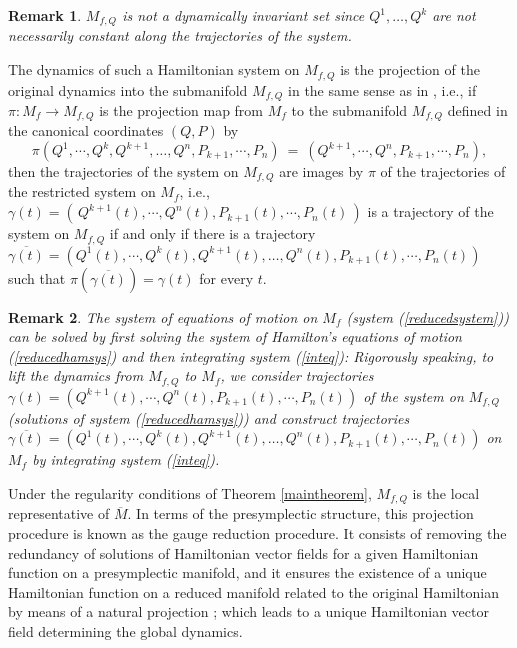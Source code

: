 \documentclass[10pt,a4paper]{article}
\newtheorem{remark}{Remark}
\begin{document}
\begin{remark}
$M_{f,Q}$ is not a dynamically invariant set since $Q^{1},\ldots,Q^{k}$ are not necessarily constant along the trajectories of the system. 
\end{remark}

The dynamics of such a Hamiltonian system on $M_{f,Q}$ is the projection of the original dynamics into the submanifold $M_{f,Q}$ in the same sense as in \cite{escobar2024particular}, i.e., if $\pi:M_{f}\longrightarrow M_{f,Q}$ is the projection map from $M_{f}$ to the submanifold $M_{f,Q}$ defined in the canonical coordinates $(Q,P)$ by 
\begin{equation*}
\pi(Q^{1},\cdots,Q^{k},Q^{k+1},\ldots,Q^{n},P_{k+1},\cdots,P_{n})\ = \ (Q^{k+1},\cdots,Q^{n},P_{k+1},\cdots,P_{n}),
\end{equation*}
then the trajectories of the system on $M_{f,Q}$ are images by $\pi$ of the trajectories of the restricted system on $M_{f}$, i.e., $\gamma(t)=(\,Q^{k+1}(t),\cdots,Q^{n}(t),P_{k+1}(t),\cdots,P_{n}(t)\,)$ is a trajectory of the system on $M_{f,Q}$ if and only if there is a trajectory $\overline{\gamma(t)}=(Q^{1}(t),\cdots,Q^{k}(t),Q^{k+1}(t),\ldots,Q^{n}(t),P_{k+1}(t),\cdots,P_{n}(t))$ such that $\pi(\overline{\gamma(t)})=\gamma(t)$ for every $t$.

\begin{remark}
The system of equations of motion on $M_{f}$ (system (\ref{reducedsystem})) can be solved by first solving the system of Hamilton's equations of motion (\ref{reducedhamsys}) and then integrating system (\ref{inteq}): Rigorously speaking, to lift the dynamics from $M_{f,Q}$ to $M_{f}$, we consider trajectories $\gamma(t)=(Q^{k+1}(t),\cdots,Q^{n}(t),P_{k+1}(t),\cdots,P_{n}(t))$ of the system on $M_{f,Q}$ (solutions of system (\ref{reducedhamsys})) and construct trajectories $\overline{\gamma(t)}=(Q^{1}(t),\cdots,Q^{k}(t),Q^{k+1}(t),\ldots,Q^{n}(t),P_{k+1}(t),\cdots,P_{n}(t))$ on $M_{f}$ by integrating system (\ref{inteq}). 
\end{remark}

Under the regularity conditions of Theorem \ref{maintheorem}, $M_{f,Q}$ is the local representative of $\overline{M}$. In terms of the presymplectic structure, this projection procedure is known as the gauge reduction procedure. It consists of removing the redundancy of solutions of Hamiltonian vector fields for a given Hamiltonian function on a presymplectic manifold, and it ensures the existence of a unique Hamiltonian function on a reduced manifold related to the original Hamiltonian by means of a natural projection \cite{echeverria1999reduction}; which leads to a unique Hamiltonian vector field determining the global dynamics.
\end{document}
